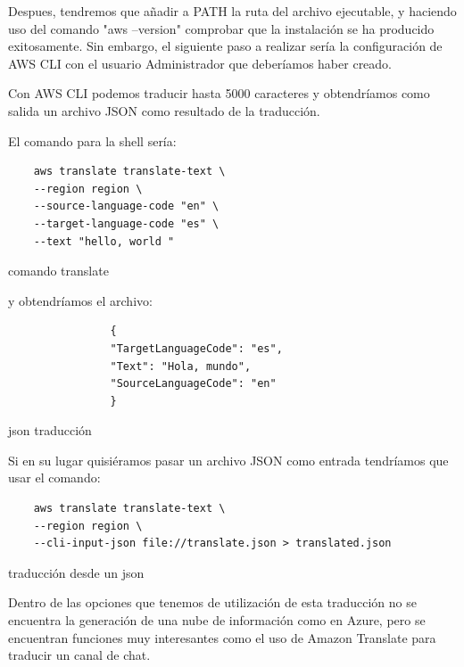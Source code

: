 \documentclass[english,runningheads,a4paper]{llncs}[2018/03/10]
\begin{document}
    Despues, tendremos que añadir a PATH la ruta del archivo ejecutable, y 
    haciendo uso del comando "aws --version" comprobar que la instalación se ha 
    producido exitosamente. Sin embargo, el siguiente paso a realizar sería la 
    configuración de AWS CLI con el usuario Administrador que deberíamos haber 
    creado.
    
    Con AWS CLI podemos traducir hasta 5000 caracteres y obtendríamos como 
    salida un archivo JSON como resultado de la traducción.
    
    El comando para la shell sería:
    
      \begin{listing}[]
        \centering
            \begin{verbatim}
    aws translate translate-text \
    --region region \
    --source-language-code "en" \
    --target-language-code "es" \
    --text "hello, world " 
    \end{verbatim}
        \caption{comando translate}
        \label{lst::comand}
        \end{listing}
    y obtendríamos el archivo:
    
    \begin{listing}[]
        \centering
            \begin{verbatim}
                {
                "TargetLanguageCode": "es",
                "Text": "Hola, mundo",
                "SourceLanguageCode": "en"
                }
    \end{verbatim}
        \caption{json traducción}
        \label{lst::comand}
        \end{listing}
    
    Si en su lugar quisiéramos pasar un archivo JSON como entrada tendríamos 
    que usar el comando:
     \begin{listing}[]
        \centering
            \begin{verbatim}
    aws translate translate-text \
    --region region \
    --cli-input-json file://translate.json > translated.json
    \end{verbatim}
        \caption{traducción desde un json}
        \label{lst::comand}
        \end{listing}
    
    Dentro de las opciones que tenemos de utilización de esta traducción no se 
    encuentra la generación de una nube de información como en Azure, pero se 
    encuentran funciones muy interesantes como el uso de Amazon Translate para 
    traducir un canal de chat.
    
\end{document}
